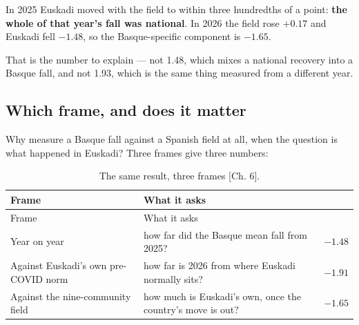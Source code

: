 \documentclass[
  10.5pt,
  a4paper,
  DIV=11,
  numbers=noendperiod]{scrartcl}
\begin{document}
In 2025 Euskadi moved with the field to within three hundredths of a
point: \textbf{the whole of that year's fall was national}. In 2026 the
field rose \(+0.17\) and Euskadi fell \(-1.48\), so the Basque-specific
component is \textbf{\(-1.65\)}.

That is the number to explain --- not 1.48, which mixes a national
recovery into a Basque fall, and not 1.93, which is the same thing
measured from a different year.

\subsection{Which frame, and does it
matter}\label{which-frame-and-does-it-matter}

Why measure a Basque fall against a Spanish field at all, when the
question is what happened in Euskadi? Three frames give three numbers:

\begin{longtable}[]{@{}
  >{\raggedright\arraybackslash}p{}
  >{\raggedright\arraybackslash}p{}
  >{\raggedleft\arraybackslash}p{}@{}}
\caption{The same result, three frames {[}Ch.
6{]}.}\label{tbl-b-frames}\tabularnewline
\toprule\noalign{}
\begin{minipage}[b]{\linewidth}\raggedright
Frame
\end{minipage} & \begin{minipage}[b]{\linewidth}\raggedright
What it asks
\end{minipage} & \begin{minipage}[b]{\linewidth}\raggedleft
2026
\end{minipage} \\
\midrule\noalign{}
\endfirsthead
\toprule\noalign{}
\begin{minipage}[b]{\linewidth}\raggedright
Frame
\end{minipage} & \begin{minipage}[b]{\linewidth}\raggedright
What it asks
\end{minipage} & \begin{minipage}[b]{\linewidth}\raggedleft
2026
\end{minipage} \\
\midrule\noalign{}
\endhead
\bottomrule\noalign{}
\endlastfoot
Year on year & how far did the Basque mean fall from 2025? &
\(-1.48\) \\
Against Euskadi's own pre-COVID norm & how far is 2026 from where
Euskadi normally sits? & \(-1.91\) \\
Against the nine-community field & how much is Euskadi's own, once the
country's move is out? & \(-1.65\) \\
\end{longtable}
\end{document}
